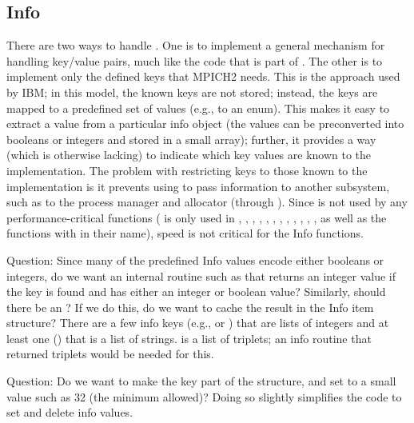 \documentclass{article}
\begin{document}
\subsection{Info}
There are two ways to handle .  One is to implement a general
mechanism for handling key/value pairs, much like the code that is part of
.  The other is to implement only the defined keys that
MPICH2 needs.  This is the approach used by IBM; in this model, the known keys
are not stored; instead, the keys are mapped to a predefined set of values
(e.g., to an enum).  This makes it easy to extract a value from a particular
info object (the values can be preconverted into booleans or integers and
stored in a small array); further, it provides a way (which is otherwise
lacking) to 
indicate which key values are known to the implementation.  
The problem with restricting keys to those known to the implementation is it
prevents using  to pass information to another subsystem, such
as to the process manager and allocator (through ). 
Since  is not used by any performance-critical functions
( is only used in , ,
, 
, , ,
, , ,
, , 
, as well as the functions with  in their
name), speed is not critical for the Info functions.

Question: Since many of the predefined Info values encode either booleans or
integers, do we want an internal routine such as 
that returns an integer value if the key is found and has either an integer or
boolean value?  Similarly, should there be an ?
If we do this, do we want to cache the result in the Info item
structure?
There are a few info keys (e.g.,  or
) that are lists of integers and at least one
() that is a list of strings.  
is a list of triplets; an info routine that returned triplets would be
needed for this.

Question: Do we want to make the key part of the structure, and set
 to a small value such as 32 (the minimum
allowed)?  Doing so slightly simplifies the code to set and delete info
values. 
\end{document}
